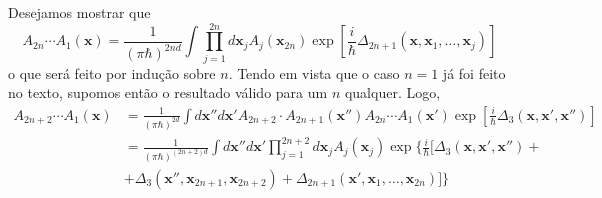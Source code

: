 \documentclass[
	12pt,
	oneside,			%
	a4paper,			%
	english,			%
	brazil				%
	]{abntex2}
\theoremstyle{definition}
\begin{document}
\begin{apendicesenv}
Desejamos mostrar que
\begin{equation}
    A_{2n} \cdots A_1 \left(\mathbf{x}\right) = \frac{1}{\left(\pi \hbar\right)^{2nd}} \int  \prod_{j=1}^{2n} d\mathbf{x}_j A_j\left(\mathbf{x}_{2n}\right) \exp\left[\frac{i}{\hbar}\Delta_{2n+1} \left(\mathbf{x},\mathbf{x}_1,\ldots,\mathbf{x}_{j}\right)\right]
\end{equation}
o que será feito por indução sobre $n$. Tendo em vista que o caso $n=1$ já foi feito no texto, supomos então o resultado válido para um $n$ qualquer. Logo,
\begin{equation}
    \begin{aligned}
        A_{2n+2} \cdots A_1 \left(\mathbf{x}\right) &= \frac{1}{\left(\pi \hbar\right)^{2d}} \int  d\mathbf{x}'' d\mathbf{x}' A_{2n+2} \cdot A_{2n+1} \left(\mathbf{x}''\right) A_{2n} \cdots A_1 \left(\mathbf{x}'\right) \exp\left[\frac{i}{\hbar}\Delta_{3} \left(\mathbf{x},\mathbf{x}',\mathbf{x}''\right)\right] \\
        &= \frac{1}{\left(\pi \hbar\right)^{(2n+2)d}} \int d\mathbf{x}'' d\mathbf{x}' \prod_{j=1}^{2n+2} d\mathbf{x}_j A_j\left(\mathbf{x}_{j}\right) \exp\bigg\{\frac{i}{\hbar}\big[\Delta_{3} \left(\mathbf{x},\mathbf{x}',\mathbf{x}''\right) + \\ &  + \Delta_{3} \left(\mathbf{x}'',\mathbf{x}_{2n+1},\mathbf{x}_{2n+2}\right) +\Delta_{2n+1} \left(\mathbf{x}',\mathbf{x}_1,\ldots,\mathbf{x}_{2n}\right)\big]\bigg\}
    \end{aligned}
\end{equation}


\end{apendicesenv}
\end{document}
